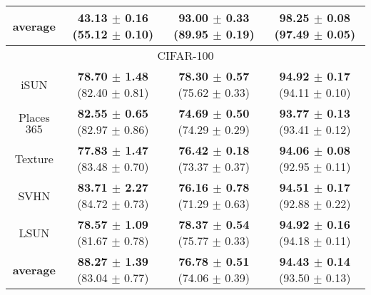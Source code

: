 \documentclass{article}
\begin{document}
\begin{table}[t]
{\begin{tabular}{c|ccc}
\midrule
\textbf{average}   & \textbf{43.13 $\pm$ 0.16} (55.12 $\pm$ 0.10) & \textbf{93.00 $\pm$ 0.33} (89.95 $\pm$ 0.19) & \textbf{98.25 $\pm$ 0.08} (97.49 $\pm$ 0.05) \\ \midrule[1pt]
\multicolumn{4}{c}{\cellcolor{greyL}CIFAR-100} \\
\midrule[1pt]
iSUN               & \textbf{78.70 $\pm$ 1.48} (82.40 $\pm$ 0.81) & \textbf{78.30 $\pm$ 0.57} (75.62 $\pm$ 0.33) & \textbf{94.92 $\pm$ 0.17} (94.11 $\pm$ 0.10) \\ 
Places$365$        & \textbf{82.55 $\pm$ 0.65} (82.97 $\pm$ 0.86) & \textbf{74.69 $\pm$ 0.50} (74.29 $\pm$ 0.29) & \textbf{93.77 $\pm$ 0.13} (93.41 $\pm$ 0.12) \\
Texture            & \textbf{77.83 $\pm$ 1.47} (83.48 $\pm$ 0.70) & \textbf{76.42 $\pm$ 0.18} (73.37 $\pm$ 0.37) & \textbf{94.06 $\pm$ 0.08} (92.95 $\pm$ 0.11) \\
SVHN               & \textbf{83.71 $\pm$ 2.27} (84.72 $\pm$ 0.73) & \textbf{76.16 $\pm$ 0.78} (71.29 $\pm$ 0.63) & \textbf{94.51 $\pm$ 0.17} (92.88 $\pm$ 0.22) \\
LSUN             & \textbf{78.57 $\pm$ 1.09} (81.67 $\pm$ 0.78) & \textbf{78.37 $\pm$ 0.54} (75.77 $\pm$ 0.33) & \textbf{94.92 $\pm$ 0.16} (94.18 $\pm$ 0.11) \\
\midrule
\textbf{average}   & \textbf{88.27 $\pm$ 1.39} (83.04 $\pm$ 0.77) & \textbf{76.78 $\pm$ 0.51} (74.06 $\pm$ 0.39) & \textbf{94.43 $\pm$ 0.14} (93.50 $\pm$ 0.13) \\ \bottomrule[1.5pt]      
\end{tabular}
}
\end{table}
\end{document}
